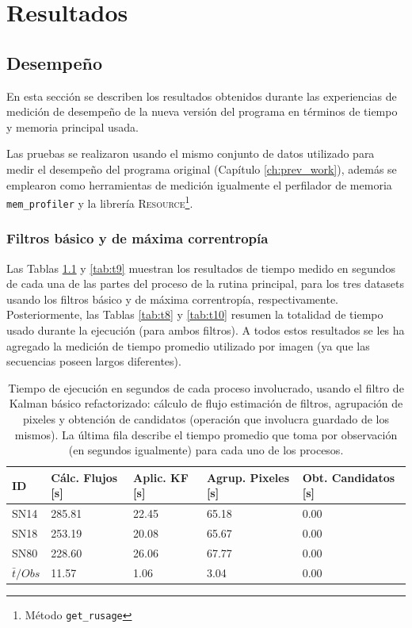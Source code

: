 \chapter{Resultados}
\label{ch:resultados}
\section{Desempe\~no}
En esta secci\'on se describen los resultados obtenidos durante las experiencias de medici\'on de desempe\~no de la nueva versi\'on del programa en t\'erminos de tiempo y memoria principal usada. 
\bigskip

Las pruebas se realizaron usando el mismo conjunto de datos utilizado para medir el desempe\~no del programa original 
(Cap\'itulo \ref{ch:prev_work}), adem\'as se emplearon como herramientas de medici\'on igualmente el perfilador de memoria \texttt{mem\_profiler} y la librer\'ia \textsc{Resource}\footnote{M\'etodo \texttt{get\_rusage}}.

\subsection{Filtros b\'asico y de m\'axima correntrop\'ia}

Las Tablas \ref{tab:t7} y \ref{tab:t9} muestran los resultados de tiempo medido en segundos de cada una de las partes del proceso de la rutina principal, para los tres datasets usando los filtros b\'asico y de m\'axima correntrop\'ia, respectivamente. Posteriormente, las Tablas \ref{tab:t8} y \ref{tab:t10} resumen la totalidad de tiempo usado durante la ejecuci\'on (para ambos filtros). A todos estos resultados se les ha agregado la medici\'on de tiempo promedio utilizado por imagen (ya que las secuencias poseen largos diferentes). 

\begin{table}[h!]
\centering
\caption{Tiempo de ejecuci\'on en segundos de cada proceso involucrado, usando el filtro de Kalman b\'asico refactorizado: c\'alculo de flujo estimaci\'on de filtros, agrupaci\'on de pixeles y obtenci\'on de candidatos (operaci\'on que involucra guardado de los mismos). La \'ultima fila describe el tiempo promedio que toma por observaci\'on (en segundos igualmente) para cada uno de los procesos. }
\begin{tabular}{|l|l|l|l|l|}
\hline
\textbf{ID} & \textbf{C\'alc. Flujos [s]} & \textbf{Aplic. KF [s]} &  \textbf{Agrup. Pixeles [s]}  & \textbf{Obt. Candidatos [s]}\\ \hline \hline
SN14        & 285.81            & 22.45        &  65.18 & 0.00 \\ \hline
SN18            & 253.19             & 20.08         &  65.67  & 0.00\\ \hline
SN80            & 228.60             & 26.06         &   67.77 & 0.00 \\ \hline \hline
$\bar{t}/Obs$ & 11.57 &  1.06 & 3.04 & 0.00\\\hline 
\end{tabular}
\label{tab:t7}
\end{table}


